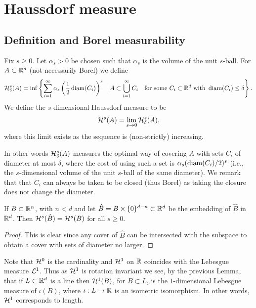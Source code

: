 \documentclass[twoside, a4paper, 10pt]{amsart}
\begin{document}
\section{Haussdorf measure}

\subsection{Definition and Borel measurability}

\begin{mydef} Fix $s \geq 0$. Let $\alpha_s>0$ be chosen such that $\alpha_s$ is the volume of the unit $s$-ball. For $A \subset \mathbb{R}^d$ (not necessarily Borel) we define 
$$\mathcal{H}^s_{\delta} (A) = \inf \left\{ \sum_{i=1}^{\infty} \alpha_s \left(\frac{1}{2}\operatorname{diam}(C_i)\right)^s ~|~ A \subset \bigcup_{i=1}^{\infty} C_i \quad\text{for some } C_i \subset \mathbb{R}^d \text{ with } \operatorname{diam}(C_i) \leq \delta \right\}.$$ We define the $s$-dimensional Haussdorf measure to be 
$$\mathcal{H}^s(A) = \lim_{s \to 0} \mathcal{H}^s_{\delta}(A), $$ where this limit exists as the sequence is (non-strictly) increasing.

\end{mydef}

In other words $\mathcal{H}^s_{\delta}(A)$ measures the optimal way of covering $A$ with sets $C_i$ of diameter at most $\delta$, where the cost of using such a set is $\alpha_s (\operatorname{diam}(C_i)/2)^s$ (i.e., the $s$-dimensional volume of the unit $s$-ball of the same diameter). We remark that that $C_i$ can always be taken to be closed (thus Borel) as taking the closure does not change the diameter.

\begin{lemma}\label{lemma: embedding Haussdorf measure} If $B \subset \mathbb{R}^n$, with $n < d$ and let $\hat{B} = B \times \{0\}^{d-n} \subset \mathbb{R}^d$ be the embedding of $\hat{B}$ in $\mathbb{R}^d$. Then $\mathcal{H}^s(\hat{B}) = \mathcal{H}^s(B)$ for all $s \geq 0$.  \end{lemma}
\begin{proof} This is clear since any cover of $\hat{B}$ can be intersected with the subspace to obtain a cover with sets of diameter no larger. \end{proof}

\begin{eg}\label{eg: 1-d Haussdorf measure is length} Note that $\mathcal{H}^0$ is the cardinality and $\mathcal{H}^1$ on $\mathbb{R}$ coincides with the Lebesgue measure $\mathcal{L}^1$. Thus as $\mathcal{H}^1$ is rotation invariant we see, by the previous Lemma, that if $L \subset \mathbb{R}^d$ is a line then $\mathcal{H}^1(B)$, for $B \subset L$, is the $1$-dimensional Lebesgue measure of $\iota(B)$, where $\iota:L \to \mathbb{R}$ is an isometric isomorphism. In other words, $\mathcal{H}^1$ corresponds to length.\end{eg}
\end{document}
